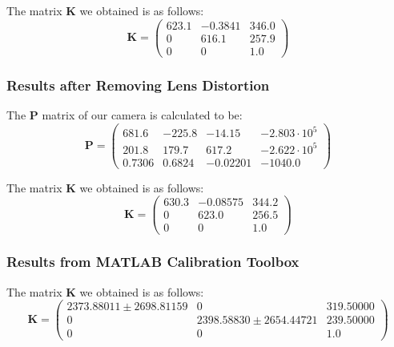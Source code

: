 \documentclass[conference]{IEEEtran}
\newcommand{\mat}[1]{\mathbf{#1}} %
\begin{document}
The matrix $\mat{K}$ we obtained is as follows:
\begin{equation}
	\mat{K} = \left(\begin{array}{ccc} 623.1 & -0.3841 & 346.0\\ 0 & 616.1 & 257.9\\ 0 & 0 & 1.0 \end{array}\right)
\end{equation}

\subsubsection{Results after Removing Lens Distortion}
The $\mat{P}$ matrix of our camera is calculated to be:
\begin{equation}
	\mat{P} = \left(\begin{array}{cccc} 681.6 & -225.8 & -14.15 & -2.803\cdot 10^5\\ 201.8 & 179.7 & 617.2 & -2.622\cdot 10^5\\ 0.7306 & 0.6824 & -0.02201 & -1040.0 \end{array}\right)
\end{equation}

The matrix $\mat{K}$ we obtained is as follows:
\begin{equation}
	\mat{K} = \left(\begin{array}{ccc} 630.3 & -0.08575 & 344.2\\ 0 & 623.0 & 256.5\\ 0 & 0 & 1.0 \end{array}\right)
\end{equation}

\subsubsection{Results from MATLAB Calibration Toolbox}

The matrix $\mat{K}$ we obtained is as follows:
\begin{equation}
	\mat{K} = \left(\begin{array}{ccc} 2373.88011\pm 2698.81159 & 0 & 319.50000\\ 0 & 2398.58830\pm 2654.44721 & 239.50000\\ 0 & 0 & 1.0 \end{array}\right)
\end{equation}
\end{document}
